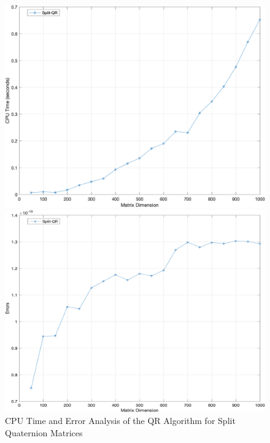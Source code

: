 \documentclass{book}
\theoremstyle{remark}
\begin{document}
\begin{multicols}{2}
\begin{figure}[H]
\begin{minipage}[b]{0.45\textwidth}
        \includegraphics[width=\textwidth]{Figure_2.png} %
    \end{minipage}
    \hfill %
    \begin{minipage}[b]{0.45\textwidth}
        \centering
        \includegraphics[width=\textwidth]{Figure_3.png} %
    \end{minipage}
    \caption{ CPU Time and Error Analysis of the QR Algorithm for Split Quaternion Matrices }
     \label{fig:Figure_2}
\end{figure}


\end{multicols}
\end{document}
